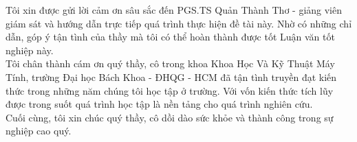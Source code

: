 \documentclass[12pt,a4paper,oneside]{book} %
\begin{document}

\coverpage

\supervisepage

\missionpage

\frontmatter

\fancyhead{}  %

\pagestyle{fancy}  %
\renewcommand{\headrulewidth}{0pt}
\begin{acknowledgments}

Tôi xin được gửi lời cảm ơn sâu sắc đến PGS.TS Quản Thành Thơ - giảng viên giám sát và hướng dẫn trực tiếp quá trình thực hiện đề tài này. Nhờ có những chỉ dẫn, góp ý tận tình của thầy mà tôi có thể hoàn thành được tốt Luận văn tốt nghiệp này.\\

Tôi chân thành cám ơn quý thầy, cô trong khoa Khoa Học Và Kỹ Thuật Máy Tính, trường Đại học Bách Khoa - ĐHQG - HCM đã tận tình truyền đạt kiến thức trong những năm chúng tôi học tập ở trường. Với vốn kiến thức tích lũy được trong suốt quá trình học tập là nền tảng cho quá trình nghiên cứu.\\

Cuối cùng, tôi xin chúc quý thầy, cô dồi dào sức khỏe và thành công trong sự nghiệp cao quý.

\end{acknowledgments}
\end{document}
